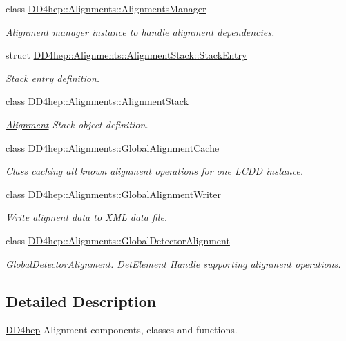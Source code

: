 \begin{DoxyCompactItemize}
class \hyperlink{class_d_d4hep_1_1_alignments_1_1_alignments_manager}{D\+D4hep\+::\+Alignments\+::\+Alignments\+Manager}
\begin{DoxyCompactList}\small\item\em \hyperlink{class_d_d4hep_1_1_alignments_1_1_alignment}{Alignment} manager instance to handle alignment dependencies. \end{DoxyCompactList}\item 
struct \hyperlink{struct_d_d4hep_1_1_alignments_1_1_alignment_stack_1_1_stack_entry}{D\+D4hep\+::\+Alignments\+::\+Alignment\+Stack\+::\+Stack\+Entry}
\begin{DoxyCompactList}\small\item\em Stack entry definition. \end{DoxyCompactList}\item 
class \hyperlink{class_d_d4hep_1_1_alignments_1_1_alignment_stack}{D\+D4hep\+::\+Alignments\+::\+Alignment\+Stack}
\begin{DoxyCompactList}\small\item\em \hyperlink{class_d_d4hep_1_1_alignments_1_1_alignment}{Alignment} Stack object definition. \end{DoxyCompactList}\item 
class \hyperlink{class_d_d4hep_1_1_alignments_1_1_global_alignment_cache}{D\+D4hep\+::\+Alignments\+::\+Global\+Alignment\+Cache}
\begin{DoxyCompactList}\small\item\em Class caching all known alignment operations for one L\+C\+DD instance. \end{DoxyCompactList}\item 
class \hyperlink{class_d_d4hep_1_1_alignments_1_1_global_alignment_writer}{D\+D4hep\+::\+Alignments\+::\+Global\+Alignment\+Writer}
\begin{DoxyCompactList}\small\item\em Write aligment data to \hyperlink{namespace_d_d4hep_1_1_x_m_l}{X\+ML} data file. \end{DoxyCompactList}\item 
class \hyperlink{class_d_d4hep_1_1_alignments_1_1_global_detector_alignment}{D\+D4hep\+::\+Alignments\+::\+Global\+Detector\+Alignment}
\begin{DoxyCompactList}\small\item\em \hyperlink{class_d_d4hep_1_1_alignments_1_1_global_detector_alignment}{Global\+Detector\+Alignment}. Det\+Element \hyperlink{class_d_d4hep_1_1_handle}{Handle} supporting alignment operations. \end{DoxyCompactList}\end{DoxyCompactItemize}


\subsection{Detailed Description}
\hyperlink{namespace_d_d4hep}{D\+D4hep} Alignment components, classes and functions. 

